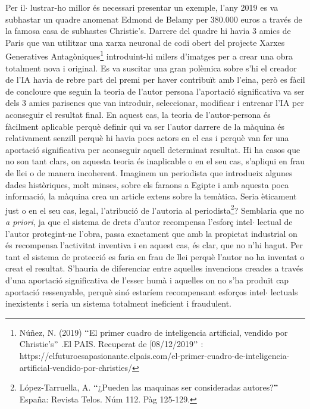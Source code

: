 \documentclass[12pt]{article}
\begin{document}
\vspace{\baselineskip}
\begin{justify}
Per il$ \cdot $ lustrar-ho millor és necessari presentar un exemple, l’any 2019 es va subhastar un quadre anomenat Edmond de Belamy per 380.000 euros a través de la famosa casa de subhastes Christie’s. Darrere del quadre hi havia 3 amics de Paris que van utilitzar una xarxa neuronal de codi obert del projecte Xarxes Generatives Antagòniques\footnote{ Núñez, N. (2019) $``$El primer cuadro de inteligencia artificial, vendido por Christie’s$"$ .El PAIS. Recuperat de [08/12/2019$"$ : https://elfuturoesapasionante.elpais.com/el-primer-cuadro-de-inteligencia-artificial-vendido-por-christies/ } introduint-hi milers d’imatges per a crear una obra totalment nova i original. Es va suscitar una gran polèmica sobre s’hi el creador de l’IA havia de rebre part del premi per haver contribuït amb l’eina, però es fàcil de concloure que seguin la teoria de l’autor persona l’aportació significativa va ser dels 3 amics parisencs que van introduir, seleccionar, modificar i entrenar l’IA per aconseguir el resultat final. En aquest cas, la teoria de l’autor-persona és fàcilment aplicable perquè definir qui va ser  l’autor darrere de la màquina és relativament senzill perquè hi havia pocs actors en el cas i perquè van fer una aportació significativa per aconseguir aquell determinat resultat.  Hi ha casos que no son tant clars, on aquesta teoria és inaplicable o en el seu cas, s’apliqui en frau de llei o de manera incoherent. Imaginem un periodista que introdueix algunes dades històriques, molt minses, sobre els faraons a Egipte i amb aquesta poca informació, la màquina crea un article extens sobre la temàtica. Seria èticament just o en el seu cas, legal, l’atribució de l’autoria al periodista\footnote{ López-Tarruella, A. $``$¿Pueden las maquinas ser consideradas autores?$"$  España: Revista Telos. Núm 112. Pàg 125-129.  }? Semblaria que no \textit{a priori}, ja que el sistema de drets d’autor recompensa l’esforç intel$ \cdot $ lectual de l’autor protegint-ne l’obra, passa exactament que amb la propietat industrial on és recompensa l’activitat inventiva i en aquest cas, és clar, que no n’hi hagut. Per tant el sistema de protecció es faria en frau de llei perquè l’autor no ha inventat o creat el resultat. S’hauria de diferenciar entre aquelles invencions creades a través d’una aportació significativa de l’esser humà i aquelles on no s’ha produït cap aportació ressenyable, perquè sinó estaríem recompensant esforços intel$ \cdot $ lectuals inexistents i seria un sistema totalment ineficient i fraudulent.
\end{justify}\par
\end{document}
